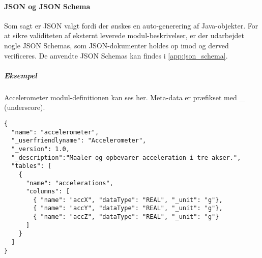 \paragraph{JSON og JSON Schema}
Som sagt er JSON valgt fordi der ønskes en auto-generering af Java-objekter.
For at sikre validiteten af eksternt leverede modul-beskrivelser, er der udarbejdet nogle JSON Schemas, som JSON-dokumenter holdes op imod og derved verificeres.
De anvendte JSON Schemas kan findes i \cref{app:json_schema}.

\subparagraph{Eksempel} Accelerometer modul-definitionen kan ses her.
Meta-data er præfikset med \_ (underscore).
\begin{lstlisting}
{
  "name": "accelerometer",
  "_userfriendlyname": "Accelerometer",
  "_version": 1.0,
  "_description":"Maaler og opbevarer acceleration i tre akser.",
  "tables": [
    {
      "name": "accelerations",
      "columns": [
        { "name": "accX", "dataType": "REAL", "_unit": "g"},
        { "name": "accY", "dataType": "REAL", "_unit": "g"},
        { "name": "accZ", "dataType": "REAL", "_unit": "g"}
      ]
    }
  ]
}
\end{lstlisting}